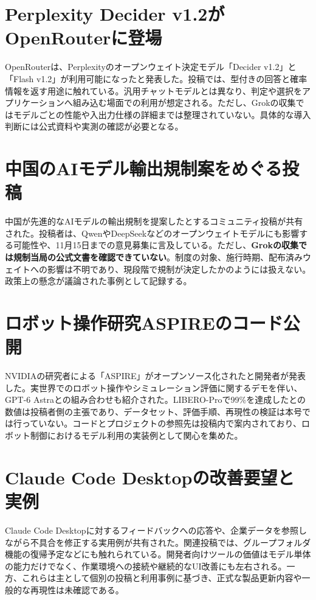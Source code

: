 \section{Perplexity Decider v1.2がOpenRouterに登場}
OpenRouterは、Perplexityのオープンウェイト決定モデル「Decider v1.2」と「Flash v1.2」が利用可能になったと発表した。投稿では、型付きの回答と確率情報を返す用途に触れている。汎用チャットモデルとは異なり、判定や選択をアプリケーションへ組み込む場面での利用が想定される。ただし、Grokの収集ではモデルごとの性能や入出力仕様の詳細までは整理されていない。具体的な導入判断には公式資料や実測の確認が必要となる。

\section{中国のAIモデル輸出規制案をめぐる投稿}
中国が先進的なAIモデルの輸出規制を提案したとするコミュニティ投稿が共有された。投稿者は、QwenやDeepSeekなどのオープンウェイトモデルにも影響する可能性や、11月15日までの意見募集に言及している。ただし、\textbf{Grokの収集では規制当局の公式文書を確認できていない}。制度の対象、施行時期、配布済みウェイトへの影響は不明であり、現段階で規制が決定したかのようには扱えない。政策上の懸念が議論された事例として記録する。

\section{ロボット操作研究ASPIREのコード公開}
NVIDIAの研究者による「ASPIRE」がオープンソース化されたと開発者が発表した。実世界でのロボット操作やシミュレーション評価に関するデモを伴い、GPT-6 Astraとの組み合わせも紹介された。LIBERO-Proで99\%を達成したとの数値は投稿者側の主張であり、データセット、評価手順、再現性の検証は本号では行っていない。コードとプロジェクトの参照先は投稿内で案内されており、ロボット制御におけるモデル利用の実装例として関心を集めた。

\section{Claude Code Desktopの改善要望と実例}
Claude Code Desktopに対するフィードバックへの応答や、企業データを参照しながら不具合を修正する実用例が共有された。関連投稿では、グループフォルダ機能の復帰予定などにも触れられている。開発者向けツールの価値はモデル単体の能力だけでなく、作業環境への接続や継続的なUI改善にも左右される。一方、これらは主として個別の投稿と利用事例に基づき、正式な製品更新内容や一般的な再現性は未確認である。

